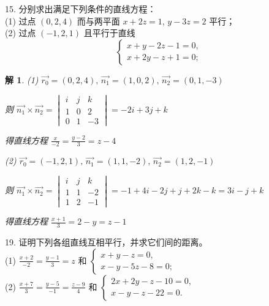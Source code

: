 \documentclass[a4paper,12pt]{article}
\newtheorem*{解}{解}
\begin{document}
15. 分别求出满足下列条件的直线方程：\\
(1) 过点 $(0, 2, 4)$ 而与两平面 $x + 2z = 1$, $y - 3z = 2$ 平行；\\
(2) 过点 $(-1, 2, 1)$ 且平行于直线
$$\begin{cases}
        x + y - 2z - 1 = 0, \\
        x + 2y - z + 1 = 0;
    \end{cases}$$

\begin{解}
(1) $\overrightarrow{r_0}=(0,2,4),\,\overrightarrow{n_1}=(1,0,2),\,\overrightarrow{n_2}=(0,1,-3)$

则 $\overrightarrow{n_1}\times\overrightarrow{n_2}=\begin{vmatrix}
        i & j & k  \\
        1 & 0 & 2  \\
        0 & 1 & -3
    \end{vmatrix}=-2i+3j+k$

得直线方程 $\frac{x}{-2}=\frac{y-2}{3}=z-4$

(2) $\overrightarrow{r_0}=(-1,2,1),\,\overrightarrow{n_1}=(1,1,-2),\,\overrightarrow{n_2}=(1,2,-1)$

则 $\overrightarrow{n_1}\times\overrightarrow{n_2}=\begin{vmatrix}
        i & j & k  \\
        1 & 1 & -2 \\
        1 & 2 & -1
    \end{vmatrix}=-1+4i-2j+j+2k-k=3i-j+k$

得直线方程 $\frac{x+1}{3}=2-y=z-1$
\end{解}

19. 证明下列各组直线互相平行，并求它们间的距离。\\
(1) $\frac{x + 2}{-2} = \frac{y - 1}{3} = z$ 和 $\begin{cases} x + y - z = 0, \\ x - y - 5z - 8 = 0; \end{cases}$\\
(2) $\frac{x + 7}{3} = \frac{y - 5}{-1} = \frac{z - 9}{4}$ 和 $\begin{cases} 2x + 2y - z - 10 = 0, \\ x - y - z - 22 = 0. \end{cases}$
\end{document}
